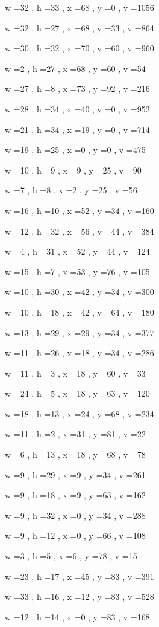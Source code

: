 \documentclass[11pt]{article}
\begin{document}
w =32 , h =33 , x =68 , y =0 , v =1056
\par
w =32 , h =27 , x =68 , y =33 , v =864
\par
w =30 , h =32 , x =70 , y =60 , v =960
\par
w =2 , h =27 , x =68 , y =60 , v =54
\par
w =27 , h =8 , x =73 , y =92 , v =216
\par
w =28 , h =34 , x =40 , y =0 , v =952
\par
w =21 , h =34 , x =19 , y =0 , v =714
\par
w =19 , h =25 , x =0 , y =0 , v =475
\par
w =10 , h =9 , x =9 , y =25 , v =90
\par
w =7 , h =8 , x =2 , y =25 , v =56
\par
w =16 , h =10 , x =52 , y =34 , v =160
\par
w =12 , h =32 , x =56 , y =44 , v =384
\par
w =4 , h =31 , x =52 , y =44 , v =124
\par
w =15 , h =7 , x =53 , y =76 , v =105
\par
w =10 , h =30 , x =42 , y =34 , v =300
\par
w =10 , h =18 , x =42 , y =64 , v =180
\par
w =13 , h =29 , x =29 , y =34 , v =377
\par
w =11 , h =26 , x =18 , y =34 , v =286
\par
w =11 , h =3 , x =18 , y =60 , v =33
\par
w =24 , h =5 , x =18 , y =63 , v =120
\par
w =18 , h =13 , x =24 , y =68 , v =234
\par
w =11 , h =2 , x =31 , y =81 , v =22
\par
w =6 , h =13 , x =18 , y =68 , v =78
\par
w =9 , h =29 , x =9 , y =34 , v =261
\par
w =9 , h =18 , x =9 , y =63 , v =162
\par
w =9 , h =32 , x =0 , y =34 , v =288
\par
w =9 , h =12 , x =0 , y =66 , v =108
\par
w =3 , h =5 , x =6 , y =78 , v =15
\par
w =23 , h =17 , x =45 , y =83 , v =391
\par
w =33 , h =16 , x =12 , y =83 , v =528
\par
w =12 , h =14 , x =0 , y =83 , v =168
\par
\newpage
\end{document}
